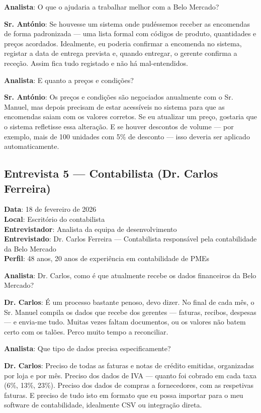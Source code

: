 \documentclass[a4paper,12pt]{scrreprt}
\begin{document}
\textbf{Analista}: O que o ajudaria a trabalhar melhor com a Belo Mercado?

\textbf{Sr. António}: Se houvesse um sistema onde pudéssemos receber as encomendas de forma padronizada --- uma lista formal com códigos de produto, quantidades e preços acordados. Idealmente, eu poderia confirmar a encomenda no sistema, registar a data de entrega prevista e, quando entregar, o gerente confirma a receção. Assim fica tudo registado e não há mal-entendidos.

\textbf{Analista}: E quanto a preços e condições?

\textbf{Sr. António}: Os preços e condições são negociados anualmente com o Sr. Manuel, mas depois precisam de estar acessíveis no sistema para que as encomendas saiam com os valores corretos. Se eu atualizar um preço, gostaria que o sistema refletisse essa alteração. E se houver descontos de volume --- por exemplo, mais de 100 unidades com 5\% de desconto --- isso deveria ser aplicado automaticamente.

\subsection*{Entrevista 5 --- Contabilista (Dr. Carlos Ferreira)}
\textbf{Data}: 18 de fevereiro de 2026\\
\textbf{Local}: Escritório do contabilista\\
\textbf{Entrevistador}: Analista da equipa de desenvolvimento\\
\textbf{Entrevistado}: Dr. Carlos Ferreira --- Contabilista responsável pela contabilidade da Belo Mercado\\
\textbf{Perfil}: 48 anos, 20 anos de experiência em contabilidade de PMEs

\textbf{Analista}: Dr. Carlos, como é que atualmente recebe os dados financeiros da Belo Mercado?

\textbf{Dr. Carlos}: É um processo bastante penoso, devo dizer. No final de cada mês, o Sr. Manuel compila os dados que recebe dos gerentes --- faturas, recibos, despesas --- e envia-me tudo. Muitas vezes faltam documentos, ou os valores não batem certo com os talões. Perco muito tempo a reconciliar.

\textbf{Analista}: Que tipo de dados precisa especificamente?

\textbf{Dr. Carlos}: Preciso de todas as faturas e notas de crédito emitidas, organizadas por loja e por mês. Preciso dos dados de IVA --- quanto foi cobrado em cada taxa (6\%, 13\%, 23\%). Preciso dos dados de compras a fornecedores, com as respetivas faturas. E preciso de tudo isto em formato que eu possa importar para o meu software de contabilidade, idealmente CSV ou integração direta.
\end{document}
